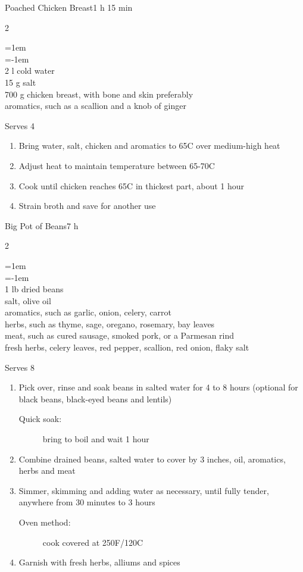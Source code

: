 \documentclass{article}
\newenvironment{recipe}[3][]
    {\begin{cardbase}[#1]{#2}{#3}
    \columnratio{0.333}
    \begin{paracol}{2}}
    {\end{paracol}\end{cardbase}}
\newenvironment{denserecipe}[3][]
    {\small
    \begin{recipe}[#1]{#2}{#3}}
    {\end{recipe}}
\newcommand{\nextcolumn}{\switchcolumn}
\newenvironment{ingredients}
    {
    \begin{obeylines}
    \vspace{\parskip}
    \setlength{\parskip}{0.25em}
    \vspace{-0.25em}
    \leftskip=1em
    \parindent=-1em}
    {\end{obeylines}}
\newenvironment{steps}
    {\begin{enumerate}[leftmargin=*,topsep=0pt]}
    {\end{enumerate}}
\newcommand{\celsius}[1]{#1\textdegree{}C}
\newcommand{\fahrenheit}[1]{#1\textdegree{}F}
\newcommand{\tag}[1]{\hspace{1em}#1}
\newcommand{\symboltag}[2]{\tag{#1\hspace{0.4em}#2}}
\newcommand{\totaltime}[1]{\symboltag{\raisebox{-0.1em}{\small\StopWatchEnd}}{#1}}
\begin{document}
\begin{recipe}{Poached Chicken Breast}{\totaltime{1 h 15 min}}
\begin{ingredients}
2 l cold water
15 g salt
700 g chicken breast, with bone and skin preferably
aromatics, such as a scallion and a knob of ginger
\end{ingredients}
\nextcolumn
Serves 4
\begin{steps}
    \item Bring water, salt, chicken and aromatics to \celsius{65} over medium-high heat
    \item Adjust heat to maintain temperature between \celsius{65-70}
    \item Cook until chicken reaches \celsius{65} in thickest part, about 1 hour
    \item Strain broth and save for another use
\end{steps}
\end{recipe}

\begin{denserecipe}{Big Pot of Beans}{\totaltime{7 h}}
\begin{ingredients}
1 lb dried beans
salt, olive oil
aromatics, such as garlic, onion, celery, carrot
herbs, such as thyme, sage, oregano, rosemary, bay leaves
meat, such as cured sausage, smoked pork, or a Parmesan rind
fresh herbs, celery leaves, red pepper, scallion, red onion, flaky salt
\end{ingredients}
\nextcolumn
Serves 8
\begin{steps}
    \item Pick over, rinse and soak beans in salted water for 4 to 8 hours (optional for black beans, black-eyed beans and lentils)
    \begin{description}
        \item[Quick soak:] bring to boil and wait 1 hour
    \end{description}
    \item Combine drained beans, salted water to cover by 3 inches, oil, aromatics, herbs and meat
    \item Simmer, skimming and adding water as necessary, until fully tender, anywhere from 30 minutes to 3 hours
    \begin{description}
        \item[Oven method:] cook covered at \fahrenheit{250}/\celsius{120}
    \end{description}
    \item Garnish with fresh herbs, alliums and spices
\end{steps}
\end{denserecipe}
\end{document}
